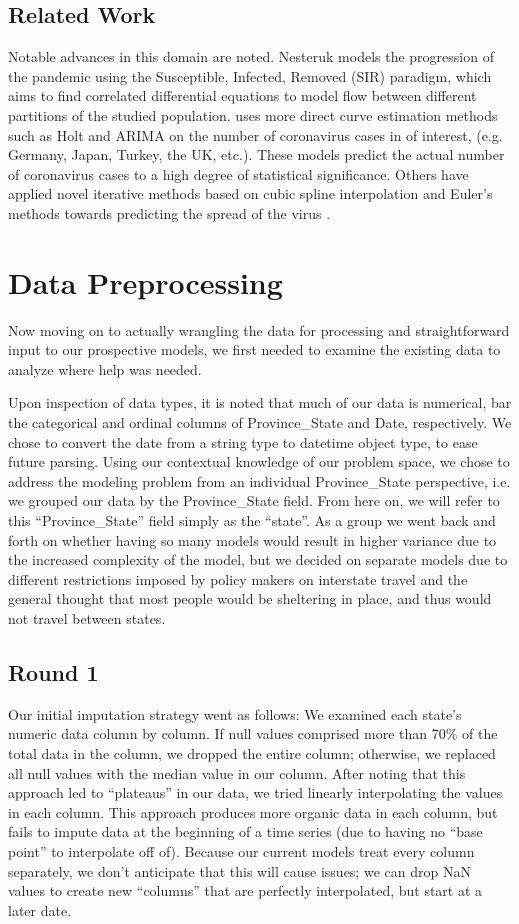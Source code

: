 \documentclass[sigconf,nonacm]{acmart}
\begin{document}
\subsection{Related Work}
Notable advances in this domain are noted. Nesteruk \cite{Nesteruk} models the
progression of the pandemic using the Susceptible, Infected, Removed (SIR)
paradigm, which aims to find correlated differential equations to model flow
between different partitions of the studied population. 
\cite{EJMO} uses more direct curve estimation methods such as Holt and ARIMA on
the number of coronavirus cases in of interest, (e.g. Germany, Japan, Turkey,
the UK, etc.). These models predict the actual number of coronavirus cases to a
high degree of statistical significance. 
Others have applied novel iterative methods based on cubic spline interpolation
and Euler's methods towards predicting the spread of the virus \cite{APPADU2020}.

\section{Data Preprocessing}
Now moving on to actually wrangling the data for processing and straightforward
input to our prospective models, we first needed to examine the existing data
to analyze where help was needed. 

Upon inspection of data types, it is noted
that much of our data is numerical, bar the categorical and ordinal columns of
Province\_State and Date, respectively. We chose to convert the date from a
string type to datetime object type, to ease future parsing. Using our
contextual knowledge of our problem space, we chose to address the modeling
problem from an individual Province\_State perspective, i.e. we grouped our
data by the Province\_State field. From here on, we will refer to this
“Province\_State” field simply as the “state”. As a group we went back and
forth on whether having so many models would result in higher variance due to
the increased complexity of the model, but we decided on separate models due to
different restrictions imposed by policy makers on interstate travel and the
general thought that most people would be sheltering in place, and thus would
not travel between states.

\subsection{Round 1}
Our initial imputation strategy went as follows: We examined each state’s
numeric data column by column. If null values comprised more than 70\% of the
total data in the column, we dropped the entire column; otherwise, we replaced
all null values with the median value in our column. After noting that this
approach led to “plateaus” in our data, we tried linearly interpolating the
values in each column. This approach produces more organic data in each column,
but fails to impute data at the beginning of a time series (due to having no
“base point” to interpolate off of). Because our current models treat every
column separately, we don’t anticipate that this will cause issues; we can drop
NaN values to create new “columns” that are perfectly interpolated, but start
at a later date.  
\end{document}
